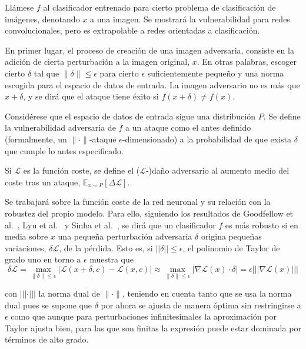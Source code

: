 Llámese $f$ al clasificador entrenado para cierto problema de clasificación de imágenes, denotando $x$ a una imagen. Se mostrará la vulnerabilidad para redes convolucionales, pero es extrapolable a redes orientadas a clasificación.

En primer lugar, el proceso de creación de una imagen adversaria, consiste en la adición de cierta perturbación a la imagen original, $x$. En otras palabras, escoger cierto $\delta$ tal que $ \| \delta \| \leq \epsilon$ para cierto $\epsilon$ suficientemente pequeño y una norma escogida para el espacio de datos de entrada. La imagen adversario no es más que $x+\delta$, y se dirá que el ataque tiene éxito si $f(x+\delta) \neq f(x)$.

\begin{definicion}
Considérese que el espacio de datos de entrada sigue una distribución $P$. Se define la vulnerabilidad adversaria de $f$ a un ataque como el antes definido (formalmente, un $\| \cdot \|$-ataque $\epsilon$-dimensionado) a la probabilidad de que exista $\delta$ que cumple lo antes especificado.
\end{definicion}
\begin{definicion}
Si $\mathcal{L}$ es la función coste, se define el ($\mathcal{L}$-)daño adversario al aumento medio del coste tras un ataque, $\mathbb{E}_{x \sim P}[\Delta \mathcal{L}]$.
\end{definicion}

Se trabajará sobre la función coste de la red neuronal y su relación con la robustez del propio modelo. Para ello, siguiendo los resultados de Goodfellow et al.~\cite{GoodfLAdvers}, Lyu et al.~\cite{LyuLAdvers} y Sinha et al.~\cite{SinhaLAdvers}, se dirá que un clasificador $f$ es más robusto si en media sobre $x$ una pequeña perturbación adversaria $\delta$ origina pequeñas variaciones, $\delta \mathcal{L}$, de la pérdida. Esto es, si $||\delta|| \leq \epsilon$, el polinomio de Taylor de grado uno en torno a $\epsilon$ muestra que
$$\delta \mathcal{L} = \max_{\|\delta\|\leq \epsilon} \left| \mathcal{L}(x+\delta,c)-\mathcal{L}(x,c) \right| \approx \max_{\|\delta\|\leq \epsilon} \left| \nabla \mathcal{L}(x) \cdot \delta \right| = \epsilon |||\nabla \mathcal{L}(x)|||$$

con $|||\cdot|||$ la norma dual de $\| \cdot \|$, teniendo en cuenta tanto que se usa la norma dual pues se supone que $\delta$ por ahora se ajusta de manera óptima sin restringirse a $\epsilon$ como que aunque para perturbaciones infinitesimales la aproximación por Taylor ajusta bien, para las que son finitas la expresión puede estar dominada por términos de alto grado.

